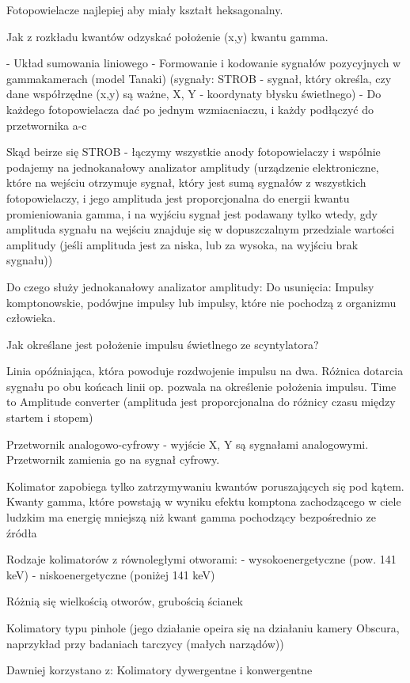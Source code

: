 \documentclass{article}
\begin{document}
Fotopowielacze najlepiej aby miały kształt heksagonalny.

Jak z rozkładu kwantów odzyskać położenie (x,y) kwantu gamma.

- Układ sumowania liniowego
- Formowanie i kodowanie sygnałów pozycyjnych w gammakamerach (model Tanaki) (sygnały: STROB - sygnał, który określa, czy dane współrzędne (x,y) są ważne, X, Y - koordynaty błysku świetlnego)
- Do każdego fotopowielacza dać po jednym wzmiacniaczu, i każdy podłączyć do przetwornika a-c

Skąd beirze się STROB - łączymy wszystkie anody fotopowielaczy i wspólnie podajemy na jednokanałowy analizator amplitudy (urządzenie elektroniczne, które na wejściu otrzymuje sygnał, który jest sumą sygnałów z wszystkich fotopowielaczy, i jego amplituda jest proporcjonalna do energii kwantu promieniowania gamma, i na wyjściu sygnał jest podawany tylko wtedy, gdy amplituda sygnału na wejściu znajduje się w dopuszczalnym przedziale wartości amplitudy (jeśli amplituda jest za niska, lub za wysoka, na wyjściu brak sygnału))

Do czego służy jednokanałowy analizator amplitudy:
Do usunięcia: Impulsy komptonowskie, podówjne impulsy lub impulsy, które nie pochodzą z organizmu człowieka.

Jak określane jest położenie impulsu świetlnego ze scyntylatora?

Linia opóźniająca, która powoduje rozdwojenie impulsu na dwa. Różnica dotarcia sygnału po obu końcach linii op. pozwala na określenie położenia impulsu. Time to Amplitude converter (amplituda jest proporcjonalna do różnicy czasu między startem i stopem)

Przetwornik analogowo-cyfrowy - wyjście X, Y są sygnałami analogowymi. Przetwornik zamienia go na sygnał cyfrowy.

Kolimator zapobiega tylko zatrzymywaniu kwantów poruszających się pod kątem. Kwanty gamma, które powstają w wyniku efektu komptona zachodzącego w ciele ludzkim ma energię mniejszą niż kwant gamma pochodzący bezpośrednio ze źródła

Rodzaje kolimatorów z równoległymi otworami:
- wysokoenergetyczne (pow. 141 keV)
- niskoenergetyczne (poniżej 141 keV)

Różnią się wielkością otworów, grubością ścianek

Kolimatory typu pinhole (jego działanie opeira się na działaniu kamery Obscura, naprzykład przy badaniach tarczycy (małych narządów))

Dawniej korzystano z:
Kolimatory dywergentne i konwergentne
\end{document}
